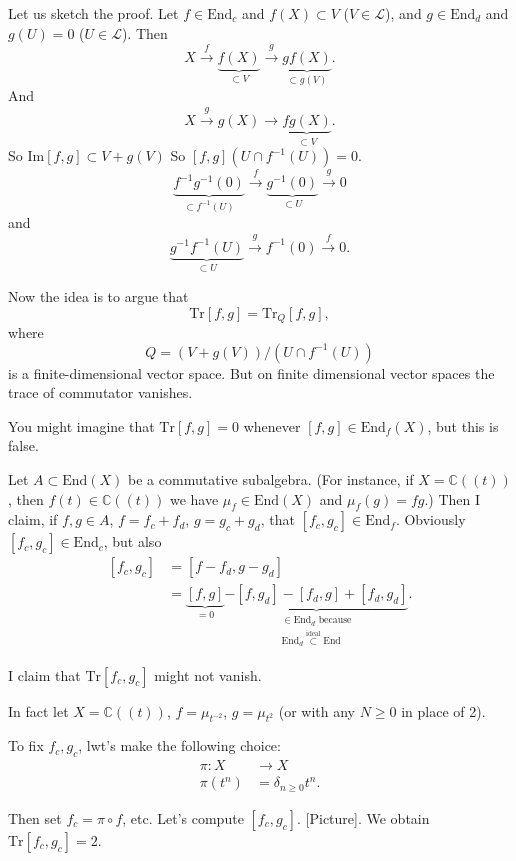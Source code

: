 Let us sketch the proof.
Let $f \in \text{End}_c$ and $f(X) \subset V$
($V \in \mathcal{L}$),
and $g \in \text{End}_d$ and $g(U)=0$
($U \in \mathcal{L}$).
Then
$$
X \xrightarrow{f}\underbrace{f(X)}_{\subset
V}\xrightarrow{g}
\underbrace{gf(X)}_{\subset g(V)}.
$$
And
$$
X \xrightarrow{g}g(X) \to
\underbrace{fg(X)}_{\subset V}.
$$
So $\text{Im}[f,g] \subset V+g(V)$
So $[f,g](U \cap f^{-1}(U))=0$.
$$
\underbrace{f^{-1}g^{-1}(0)}_{\subset
f^{-1}(U)}
\xrightarrow{f}\underbrace{g^{-1}(0)}
_{\subset U}\xrightarrow{g}0
$$
and
$$
\underbrace{g^{-1}f^{-1}(U)}_{\subset U}
\xrightarrow{g}f^{-1}(0)\xrightarrow{f}0.
$$

\noindent
Now the idea is to argue that
$$
\text{Tr}[f,g]=\text{Tr}_Q[f,g],
$$
where
$$
Q=(V+g(V))/(U\cap f^{-1}(U))
$$
is a finite-dimensional vector space.
But on finite dimensional vector spaces
the trace of commutator vanishes.

\medskip\noindent
You might imagine that $\text{Tr}[f,g]=0$
whenever $[f,g]\in \text{End}_f(X)$,
but this is false.

\begin{example}
\label{example-trace-commu-not-vanis}
Let $A \subset \text{End} (X)$ be a
commutative subalgebra.
(For instance, if $X= \mathbb{C}((t))$,
then $f(t) \in \mathbb{C}((t))$
we have $\mu_f \in \text{End}(X)$
and $\mu_f(g)=fg$.)
Then I claim, if $f,g \in A$,
$f=f_c+f_d$,  $g=g_c +g_d$,
that $[f_c,g_c] \in \text{End}_f$.
Obviously  $[f_c,g_c] \in \text{End}_c$,
but also
$$
\begin{aligned}
[f_c,g_c]&=[f-f_d,g-g_d]\\
&=\underbrace{[f,g]}_{=0}
\underbrace{-[f,g_d]-[f_d,g]+[f_d,g_d]}_
{\substack{\in\text{End}_d \text{ because
}\\\text{End}_d \overset{\text{ideal}}
{\subset} \text{End}}}.
\end{aligned}
$$

\noindent
I claim that $\text{Tr}[f_c,g_c]$ might not
vanish.

In fact let $X=\mathbb{C}((t))$,
$f=\mu_{t^{-2}}$, $g=\mu_{t^2}$
(or with any $N \geq 0$ in place of 2).

To fix $f_c,g_c$, lwt's make the following
choice:
 $$
\begin{aligned}
\pi: X &\longrightarrow X \\
\pi(t^n) &= \delta_{n\geq 0}t^n.
\end{aligned}
$$

\noindent
Then set $f_c=\pi \circ f$, etc.
Let's compute $[f_c,g_c]$.
[Picture]. We obtain $\text{Tr}[f_c,g_c]=2$.
\end{example}

